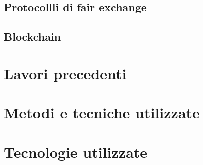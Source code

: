 \subsection{Protocollli di fair exchange}

\subsection{Blockchain}




\section{Lavori precedenti}







\section{Metodi e tecniche utilizzate}

%
%


\section{Tecnologie utilizzate}

%
%

